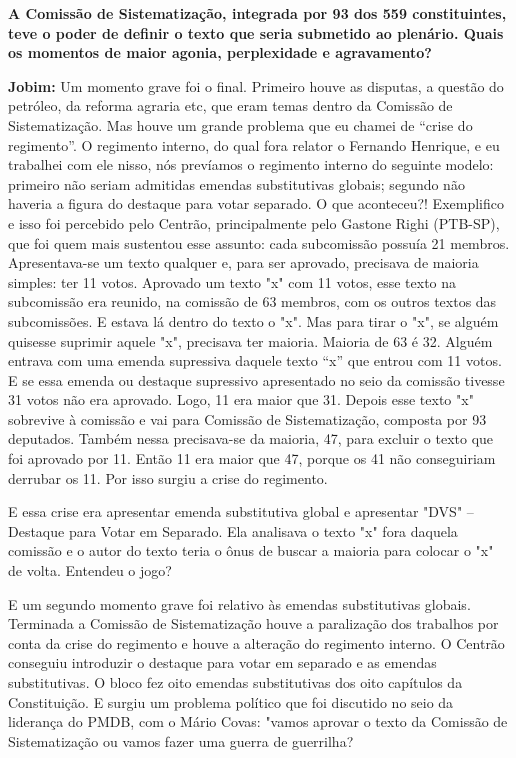 \textbf{A Comissão de Sistematização, integrada por 93 dos 559
constituintes, teve o poder de definir o texto que seria submetido ao
plenário. Quais os momentos de maior agonia, perplexidade e
agravamento?}

\textbf{Jobim:} Um momento grave foi o final. Primeiro houve as
disputas, a questão do petróleo, da reforma agraria etc, que eram temas
dentro da Comissão de Sistematização. Mas houve um grande problema que
eu chamei de ``crise do regimento''. O regimento interno, do qual fora
relator o Fernando Henrique, e eu trabalhei com ele nisso, nós prevíamos
o regimento interno do seguinte modelo: primeiro não seriam admitidas
emendas substitutivas globais; segundo não haveria a figura do destaque
para votar separado. O que aconteceu?! Exemplifico e isso foi percebido
pelo Centrão, principalmente pelo Gastone Righi (PTB-SP), que foi quem
mais sustentou esse assunto: cada subcomissão possuía 21 membros.
Apresentava-se um texto qualquer e, para ser aprovado, precisava de
maioria simples: ter 11 votos. Aprovado um texto "x" com 11 votos, esse
texto na subcomissão era reunido, na comissão de 63 membros, com os
outros textos das subcomissões. E estava lá dentro do texto o "x". Mas
para tirar o "x", se alguém quisesse suprimir aquele "x", precisava ter
maioria. Maioria de 63 é 32. Alguém entrava com uma emenda supressiva
daquele texto ``x'' que entrou com 11 votos. E se essa emenda ou
destaque supressivo apresentado no seio da comissão tivesse 31 votos não
era aprovado. Logo, 11 era maior que 31. Depois esse texto "x" sobrevive
à comissão e vai para Comissão de Sistematização, composta por 93
deputados. Também nessa precisava-se da maioria, 47, para excluir o
texto que foi aprovado por 11. Então 11 era maior que 47, porque os 41
não conseguiriam derrubar os 11. Por isso surgiu a crise do regimento.

E essa crise era apresentar emenda substitutiva global e apresentar
"DVS" -- Destaque para Votar em Separado. Ela analisava o texto "x" fora
daquela comissão e o autor do texto teria o ônus de buscar a maioria
para colocar o "x" de volta. Entendeu o jogo?

E um segundo momento grave foi relativo às emendas substitutivas
globais. Terminada a Comissão de Sistematização houve a paralização dos
trabalhos por conta da crise do regimento e houve a alteração do
regimento interno. O Centrão conseguiu introduzir o destaque para votar
em separado e as emendas substitutivas. O bloco fez oito emendas
substitutivas dos oito capítulos da Constituição. E surgiu um problema
político que foi discutido no seio da liderança do PMDB, com o Mário
Covas: "vamos aprovar o texto da Comissão de Sistematização ou vamos
fazer uma guerra de guerrilha?


